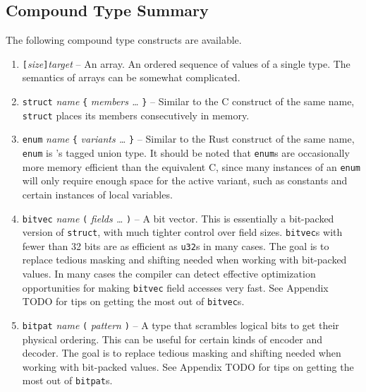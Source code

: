 \subsection{Compound Type Summary}

The following compound type constructs are available.

\begin{enumerate}

\item {\tt [}{\em size}{\tt ]}{\em target} -- An array. An ordered
sequence of values of a single type. The semantics of arrays can be
somewhat complicated.

\item {\tt struct} {\em name} {\tt \{} {\em members \dots} {\tt \}}
-- Similar to the C construct of the same name, {\tt struct} places its
members consecutively in memory.

\item {\tt enum} {\em name} {\tt \{} {\em variants \dots} {\tt \}} --
Similar to the Rust construct of the same name, {\tt enum} is \gx{}'s
tagged union type. It should be noted that {\tt enum}s are occasionally
more memory efficient than the equivalent C, since many instances of
an {\tt enum} will only require enough space for the active variant,
such as constants and certain instances of local variables.

\item {\tt bitvec} {\em name} {\tt (} {\em fields \dots} {\tt )} -- A
bit vector. This is essentially a bit-packed version of {\tt struct},
with much tighter control over field sizes. {\tt bitvec}s with fewer
than 32 bits are as efficient as {\tt u32}s in many cases. The goal is to
replace tedious masking and shifting needed when working with bit-packed
values. In many cases the compiler can detect effective optimization
opportunities for making {\tt bitvec} field accesses very fast. See
Appendix TODO for tips on getting the most out of {\tt bitvec}s.

\item {\tt bitpat} {\em name} {\tt (} {\em pattern} {\tt )} -- A type that
scrambles logical bits to get their physical ordering. This can be useful
for certain kinds of encoder and decoder. The goal is to replace tedious
masking and shifting needed when working with bit-packed values. See
Appendix TODO for tips on getting the most out of {\tt bitpat}s.

\end{enumerate}
